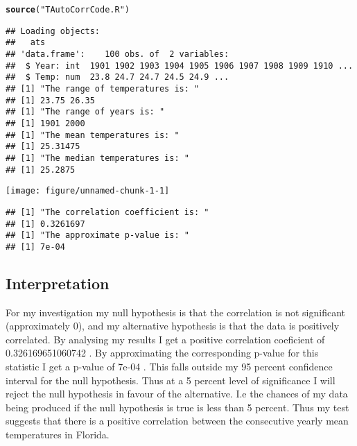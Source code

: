 \documentclass[10pt]{article}\usepackage[]{graphicx}\usepackage[]{color}
\makeatletter
\def\maxwidth{ %
  \ifdim\Gin@nat@width>\linewidth
    \linewidth
  \else
    \Gin@nat@width
  \fi
}
\newcommand{\hlstr}[1]{\textcolor[rgb]{0.192,0.494,0.8}{#1}}%
\newcommand{\hlstd}[1]{\textcolor[rgb]{0.345,0.345,0.345}{#1}}%
\newcommand{\hlkwd}[1]{\textcolor[rgb]{0.737,0.353,0.396}{\textbf{#1}}}%
\newenvironment{kframe}{%
 \def\at@end@of@kframe{}%
 \ifinner\ifhmode%
  \def\at@end@of@kframe{\end{minipage}}%
  \begin{minipage}{\columnwidth}%
 \fi\fi%
 \def\FrameCommand##1{\hskip\@totalleftmargin \hskip-\fboxsep
 \colorbox{shadecolor}{##1}\hskip-\fboxsep
     \hskip-\linewidth \hskip-\@totalleftmargin \hskip\columnwidth}%
 \MakeFramed {\advance\hsize-\width
   \@totalleftmargin\z@ \linewidth\hsize
   \@setminipage}}%
 {\par\unskip\endMakeFramed%
 \at@end@of@kframe}
\newenvironment{knitrout}{}{} %
\makeatother
\begin{document}
\begin{knitrout}
\color{fgcolor}\begin{kframe}
\begin{alltt}
\hlkwd{source}\hlstd{(}\hlstr{"TAutoCorrCode.R"}\hlstd{)}
\end{alltt}
\begin{verbatim}
## Loading objects:
##   ats
## 'data.frame':	100 obs. of  2 variables:
##  $ Year: int  1901 1902 1903 1904 1905 1906 1907 1908 1909 1910 ...
##  $ Temp: num  23.8 24.7 24.7 24.5 24.9 ...
## [1] "The range of temperatures is: "
## [1] 23.75 26.35
## [1] "The range of years is: "
## [1] 1901 2000
## [1] "The mean temperatures is: "
## [1] 25.31475
## [1] "The median temperatures is: "
## [1] 25.2875
\end{verbatim}
\end{kframe}
\texttt{[image: figure/unnamed-chunk-1-1]} 
\begin{kframe}\begin{verbatim}
## [1] "The correlation coefficient is: "
## [1] 0.3261697
## [1] "The approximate p-value is: "
## [1] 7e-04
\end{verbatim}
\end{kframe}
\end{knitrout}


\subsection*{Interpretation}



For my investigation my null hypothesis is that the correlation is not significant (approximately 0), and my alternative hypothesis is that the data is positively correlated. By analysing my results I get a positive correlation coeficient of  0.326169651060742 . By approximating the corresponding p-value for this statistic I get a p-value of  7e-04 . This falls outside my 95 percent confidence interval for the null hypothesis. Thus at a 5 percent level of significance I will reject the null hypothesis in favour of the alternative. I.e the chances of my data being produced if the null hypothesis is true is less than 5 percent. Thus my test suggests that there is a positive correlation between the consecutive yearly mean temperatures in Florida.
\end{document}
